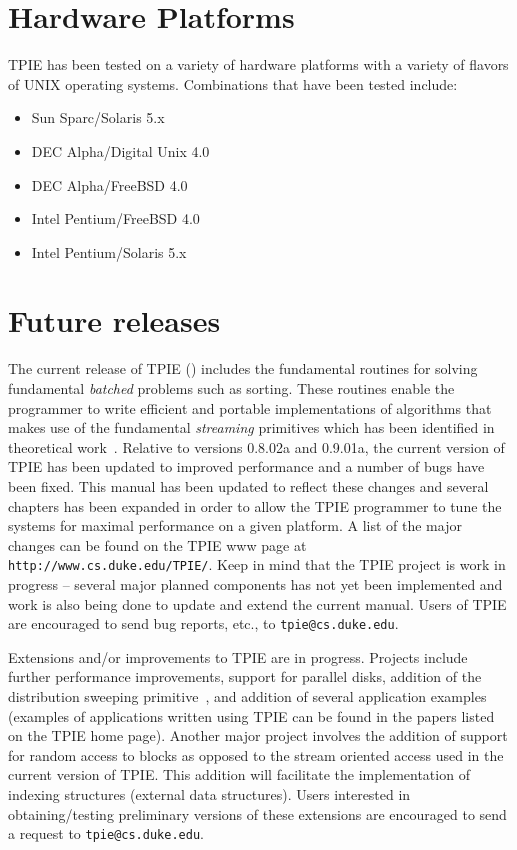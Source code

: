 \section{Hardware Platforms}

TPIE has been tested on a variety of hardware platforms with a variety of
flavors of UNIX operating systems. Combinations that have been tested
include:
\begin{itemize}
\item Sun Sparc/Solaris 5.x
\item DEC Alpha/Digital Unix 4.0
\item DEC Alpha/FreeBSD 4.0
\item Intel Pentium/FreeBSD 4.0
\item Intel Pentium/Solaris 5.x
\end{itemize}


\section{Future releases}

The current release of TPIE (\version) includes the fundamental routines for
solving fundamental {\em batched} problems such as sorting. These routines
enable the programmer to write efficient and portable implementations of
algorithms that makes use of the fundamental {\em streaming} primitives
which has been identified in theoretical
work~\cite{arge:gisbook,vitter:podssurvey}. Relative to
versions 0.8.02a and 0.9.01a, the
current version of TPIE has been updated to improved performance and a
number of bugs have been fixed. This manual has been updated to reflect
these changes and several chapters has been expanded in order to allow the
TPIE programmer to tune the systems for maximal performance on a given
platform. A list of the major changes can be found on the TPIE www page at
\verb|http://www.cs.duke.edu/TPIE/|. Keep in mind that the TPIE project is
work in progress -- several major planned components has not yet been
implemented and work is also being done to update and extend the current
manual. Users of TPIE are encouraged to send bug reports, etc., to
\verb|tpie@cs.duke.edu|.

Extensions and/or improvements to TPIE are in
progress. Projects include further performance improvements, support for
parallel disks, addition of the distribution sweeping
primitive~\cite{goodrich:external}, and addition of several application
examples (examples of applications written using TPIE can be found in the
papers listed on the TPIE home page). Another major project involves the
addition of support for random access to blocks as opposed to the stream
oriented access used in the current version of TPIE. This addition will
facilitate the implementation of indexing structures (external data
structures). Users interested in obtaining/testing preliminary versions of
these extensions are encouraged to send a request to
\verb|tpie@cs.duke.edu|.


